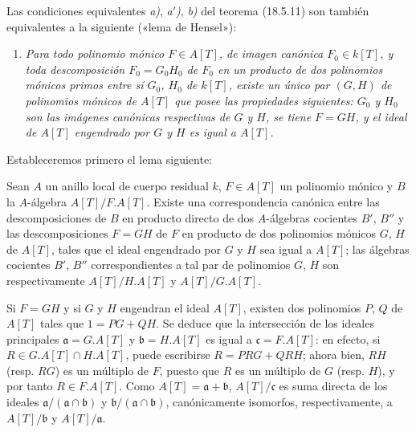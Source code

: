 \begin{remark}[18.5.13]
\label{IV.18.5.13}
Las condiciones equivalentes \emph{a)}, \emph{a$'$)}, \emph{b)} del teorema (18.5.11) son también equivalentes a la siguiente («lema de Hensel»):
\begin{enumerate}
  \item[\textup{a$''$)}] \itshape Para todo polinomio mónico $F\in A[T]$, de imagen canónica $F_0\in k[T]$, y toda descomposición $F_0=G_0H_0$ de $F_0$ en un producto de dos polinomios mónicos \textup{primos entre sí} $G_0$, $H_0$ de $k[T]$, existe un único par $(G,H)$ de polinomios mónicos de $A[T]$ que posee las propiedades siguientes: $G_0$ y $H_0$ son las imágenes canónicas respectivas de $G$ y $H$, se tiene $F=GH$, y el ideal de $A[T]$ engendrado por $G$ y $H$ es igual a $A[T]$.
\end{enumerate}
\end{remark}

Estableceremos primero el lema siguiente:

\begin{lemma}[18.5.13.1]
\label{IV.18.5.13.1}
Sean $A$ un anillo local de cuerpo residual $k$, $F\in A[T]$ un polinomio mónico y $B$ la $A$-álgebra $A[T]/F.A[T]$. Existe una correspondencia canónica entre las descomposiciones de $B$ en producto directo de dos $A$-álgebras cocientes $B'$, $B''$ y las descomposiciones $F=GH$ de $F$ en producto de dos polinomios mónicos $G$, $H$ de $A[T]$, tales que el ideal engendrado por $G$ y $H$ sea igual a $A[T]$; las álgebras cocientes $B'$, $B''$ correspondientes a tal par de polinomios $G$, $H$ son respectivamente $A[T]/H.A[T]$ y $A[T]/G.A[T]$.
\end{lemma}


Si $F=GH$ y si $G$ y $H$ engendran el ideal $A[T]$, existen dos polinomios $P$, $Q$ de $A[T]$ tales que $1=PG+QH$. Se deduce que la intersección de los ideales principales $\mathfrak a=G.A[T]$ y $\mathfrak b=H.A[T]$ es igual a $\mathfrak c=F.A[T]$: en efecto, si $R\in G.A[T]\cap H.A[T]$, puede escribirse $R=PRG+QRH$; ahora bien, $RH$ (resp. $RG$) es un múltiplo de $F$, puesto que $R$ es un múltiplo de $G$ (resp. $H$), y por tanto $R\in F.A[T]$. Como $A[T]=\mathfrak a+\mathfrak b$, $A[T]/\mathfrak c$ es suma directa de los ideales $\mathfrak a/(\mathfrak a\cap\mathfrak b)$ y $\mathfrak b/(\mathfrak a\cap\mathfrak b)$, canónicamente isomorfos, respectivamente, a $A[T]/\mathfrak b$ y $A[T]/\mathfrak a$.

